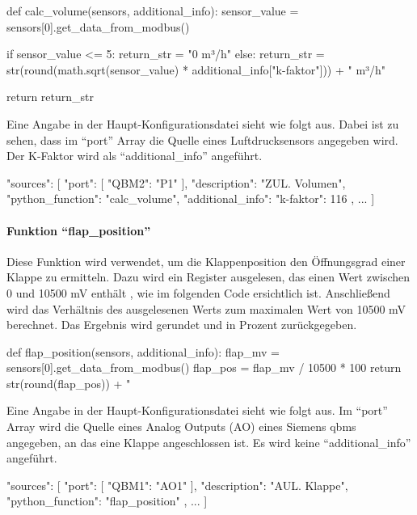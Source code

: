 \begin{pythoncode}
def calc_volume(sensors, additional_info):
	sensor_value = sensors[0].get_data_from_modbus()
	
	if sensor_value <= 5:
		return_str = "0 m³/h"
	else:
		return_str = str(round(math.sqrt(sensor_value) * additional_info["k-faktor"])) + " m³/h"
	
	return return_str
\end{pythoncode}

Eine Angabe in der Haupt-Konfigurationsdatei sieht wie folgt aus. Dabei ist zu sehen, dass im \enquote{port} Array die Quelle eines Luftdrucksensors angegeben wird. Der K-Faktor wird als \enquote{additional\_info} angeführt.

\begin{jsoncode}
"sources": [
	{
		"port": [
			{"QBM2": "P1"}
		],
		"description": "ZUL. Volumen",
		"python_function": "calc_volume",
		"additional_info": {"k-faktor": 116}
	},
	...
]
\end{jsoncode}



\paragraph{Funktion \enquote{flap\_position}}
Diese Funktion wird verwendet, um die Klappenposition \bzw den Öffnungsgrad einer Klappe zu ermitteln. 
Dazu wird ein Register ausgelesen, das einen Wert zwischen 0 und 10500 mV enthält \cite[vgl.][17]{siemens:2021}, wie im folgenden Code ersichtlich ist. Anschließend wird das Verhältnis des ausgelesenen Werts zum maximalen Wert von 10500 mV berechnet. Das Ergebnis wird gerundet und in Prozent zurückgegeben.

\begin{pythoncode}
def flap_position(sensors, additional_info):
	flap_mv = sensors[0].get_data_from_modbus()
	flap_pos = flap_mv / 10500 * 100
	return str(round(flap_pos)) + " %
\end{pythoncode}

Eine Angabe in der Haupt-Konfigurationsdatei sieht wie folgt aus. Im \enquote{port} Array wird die Quelle eines Analog Outputs (AO) eines Siemens \gls{qbm}s angegeben, an das eine Klappe angeschlossen ist. Es wird keine \enquote{additional\_info} angeführt.

\begin{jsoncode}
"sources": [
	{
		"port": [
			{"QBM1": "AO1"}
		],
		"description": "AUL. Klappe",
		"python_function": "flap_position"
	},
	...
]
\end{jsoncode}



